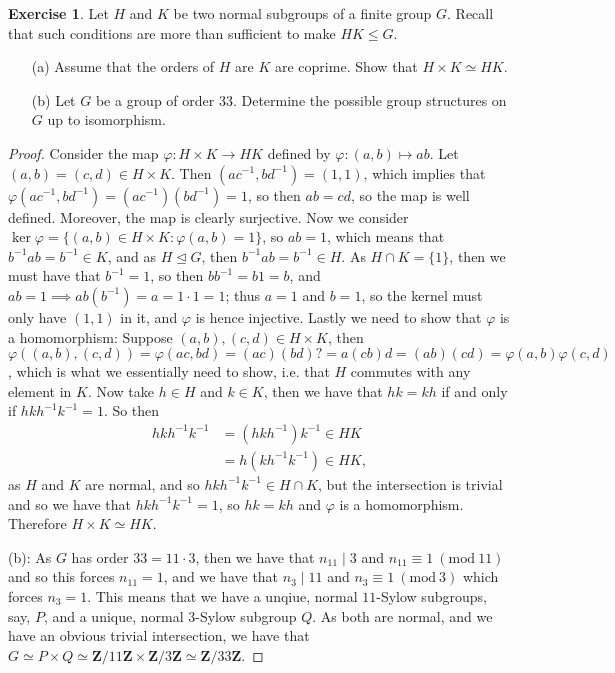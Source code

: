 \documentclass[9pt,reqno]{amsart}
\theoremstyle{definition}
\newtheorem{exercise}{Exercise}[section]
\newcommand{\zz}{\mathbf Z}
\newcommand{\Mod}[1]{\ (\mathrm{mod}\ #1)}
\begin{document}
\begin{exercise} Let $H$ and $K$ be two normal subgroups of a finite group $G$. Recall that such conditions are more than sufficient to make $HK \leq G$. 
\begin{itemize}
	\item[(a)] Assume that the orders of $H$ are $K$ are coprime. Show that $H \times K \simeq HK$.
	\item[(b)] Let $G$ be a group of order $33$. Determine the possible group structures on $G$ up to isomorphism. 
\end{itemize}
\end{exercise}
\begin{proof} Consider the map $\varphi \colon H \times K \to HK$ defined by $\varphi \colon (a,b) \mapsto ab$. Let $(a,b) = (c, d ) \in H \times K$. Then $(ac^{-1}, bd^{-1}) = (1, 1)$, which implies that $\varphi (ac^{-1}, bd^{-1}) = (ac^{-1})(bd^{-1}) = 1$, so then $ab =cd$, so the map is well defined. 	Moreover, the map is clearly surjective. Now we consider $\ker \varphi = \{ (a,b) \in H \times K \colon \varphi (a, b) = 1 \}$, so $ab = 1$, which means that $b^{-1} a b = b^{-1} \in K$, and as $H \trianglelefteq G$, then $b^{-1} a b = b^{-1} \in H$. As $H \cap K = \{1 \}$, then we must have that $b^{-1} =1$, so then $b b^{-1} = b 1 = b$, and $ab = 1 \implies ab(b^{-1}) = a = 1 \cdot 1 = 1$; thus $a = 1$ and $b = 1$, so the kernel must only have $(1, 1)$ in it, and $\varphi$ is hence injective. Lastly we need to show that $\varphi$ is a homomorphism: Suppose $(a, b), (c,d) \in H \times K$, then $\varphi((a,b) , (c,d)) = \varphi(ac, bd) = (ac)(bd) ?= a(cb) d = (ab)(cd) = \varphi(a,b) \varphi (c,d)$, which is what we essentially need to show, i.e. that $H$ commutes with any element in $K$. Now take $h \in H$ and $k \in K$, then we have that $hk=kh$ if and only if $hk h^{-1} k^{-1} = 1$.  So then 
\begin{align}
	hkh^{-1} k^{-1} &= (hkh^{-1} )k^{-1} \in HK\\
	&= h(kh^{-1}k^{-1}) \in HK, 
\end{align}
as $H$ and $K$ are normal, and so $hkh^{-1} k^{-1} \in H \cap K$, but the intersection is trivial and so we have that $hk h^{-1}k^{-1} = 1$, so $hk = kh$ and $\varphi$ is a homomorphism. Therefore $ H \times K \simeq HK$.

(b): As $G$ has order $33 =11 \cdot 3$, then we have that $n_{11} \mid 3$ and $n_{11} \equiv 1 \Mod{11}$ and so this forces $n_{11}= 1$, and we have that $n_3 \mid 11$ and $n_3 \equiv 1 \Mod{3}$ which forces $n_3 = 1$. This means that we have a unqiue, normal $11$-Sylow subgroups, say, $P$, and a unique, normal $3$-Sylow subgroup $Q$. As both are normal, and we have an obvious trivial intersection, we have that $G \simeq P \times Q \simeq \zz/ 11\zz \times \zz/3\zz \simeq \zz / 33 \zz$. 
\end{proof}	
\end{document}
